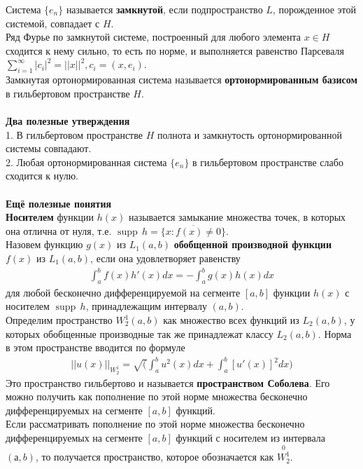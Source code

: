 \documentclass{article}
\begin{document}
	Система $\{{e}_{n}\}$ называется \textbf{замкнутой}, если подпространство $L$, порожденное этой системой, совпадает с $H$.\\
	Ряд Фурье по замкнутой системе, построенный для любого элемента $x\in H$ сходится к нему сильно, то есть по норме, и выполняется
	равенство Парсеваля $\sum_{i=1}^{\infty} {|{c}_{i}|}^{2}={||x||}^{2}, {c}_{i}=(x,{e}_{i})$.\\
	Замкнутая ортонормированная система называется
	\textbf{ортонормированным базисом} в гильбертовом пространстве $H$.\\
	\\
	\textbf{Два полезные утверждения}\\
	1. В гильбертовом пространстве $H$ полнота и замкнутость ортонормированной системы совпадают.\\
	2. Любая ортонормированная система $\{{e}_{n}\}$ в гильбертовом пространстве слабо сходится к нулю.\\
	\\
	\textbf{Ещё полезные понятия}\\
	\textbf{Носителем} функции $h(x)$ называется замыкание множества точек, в которых она отлична от нуля, т.е. $\operatorname{supp}\,h =\overline{\{x:f(x)\ne 0\}}$.\\
	Назовем функцию $g(x)$ из ${L}_{1}(a,b)$ \textbf{обобщенной производной функции} $f(x)$ из ${L}_{1}(a,b)$, если она удовлетворяет
	равенству
	\begin{equation}
	\begin{aligned}
	\int_{a}^{b} f(x)h'(x)dx=-\int_{a}^{b} g(x)h(x)dx
	\end{aligned}
	\end{equation}
	для любой бесконечно дифференцируемой на сегменте $[a,b]$ функции $h(x)$ с носителем $\operatorname{supp}\,h$, принадлежащим интервалу $(a,b)$.\\
	
	Определим пространство $W_{2}^{1}(a,b)$ как множество всех функций из ${L}_{2}(a,b)$, у которых обобщенные производные так же принадлежат классу ${L}_{2}(a,b)$. Норма в этом пространстве вводится по формуле 
	\begin{equation}
	\begin{aligned}
	{||u(x)||}_{W_{2}^{1}}=\sqrt(\int_{a}^{b} {u}^{2}(x)dx+\int_{a}^{b} {[u'(x)]}^{2}dx)
	\end{aligned}
	\end{equation}
	Это пространство гильбертово и называется \textbf{пространством Соболева}. Его можно получить как пополнение по этой норме множества бесконечно дифференцируемых на сегменте $[a,b]$ функций.\\
	Если рассматривать пополнение по этой норме множества бесконечно дифференцируемых на сегменте $[a,b]$ функций с носителем из интервала $(а,b)$, то получается пространство, которое
	обозначается как $\overset{0}{W_{2}^{1}}$.
\end{document}
